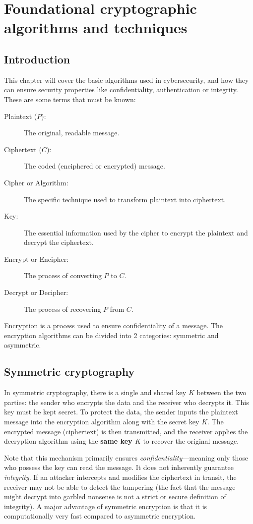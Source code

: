 \chapter[]{Foundational cryptographic algorithms and techniques}
\section{Introduction}
This chapter will cover the basic algorithms used in cybersecurity, and how they can ensure security properties like confidentiality, authentication or integrity.
These are some terms that must be known:
\begin{description}
    \item[Plaintext ($P$):] The original, readable message.
    \item[Ciphertext ($C$):] The coded (enciphered or encrypted) message.
    \item[Cipher or Algorithm:] The specific technique used to transform plaintext into ciphertext.
    \item[Key:] The essential information used by the cipher to encrypt the plaintext and decrypt the ciphertext.
    \item[Encrypt or Encipher:] The process of converting $P$ to $C$.
    \item[Decrypt or Decipher:] The process of recovering $P$ from $C$.
\end{description}

Encryption is a process used to ensure confidentiality of a message. The encryption algorithms can be divided into 2 categories: symmetric and asymmetric.

\section{Symmetric cryptography}
In symmetric cryptography, there is a single and shared key $K$ between the two parties: the sender who encrypts the data and the receiver who decrypts it. This key must be kept secret. To protect the data, the sender inputs the plaintext message into the encryption algorithm along with the secret key $K$.
The encrypted message (ciphertext) is then transmitted, and the receiver applies the decryption algorithm using the \textbf{same key $K$} to recover the original message.

Note that this mechanism primarily ensures \textit{confidentiality}—meaning only those who possess the key can read the message. It does not inherently guarantee \textit{integrity}. If an attacker intercepts and modifies the ciphertext in transit, the receiver may not be able to detect the tampering (the fact that the message might decrypt into garbled nonsense is not a strict or secure definition of integrity).
A major advantage of symmetric encryption is that it is computationally very fast compared to asymmetric encryption.

